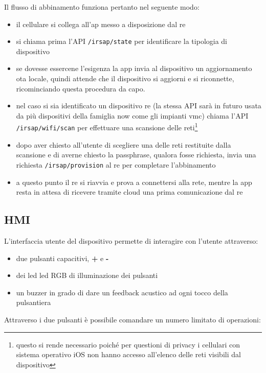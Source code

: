 \documentclass[12pt,a4paper,twoside,titlepage]{book}
\begin{document}
Il flusso di abbinamento funziona pertanto nel seguente modo:
\begin{itemize}
    \item il cellulare si collega all'\acrshort{ap} messo a disposizione dal \acrshort{re}
    \item si chiama prima l'API \texttt{/irsap/state} per identificare la tipologia di dispositivo
    \item se dovesse essercene l'esigenza la app invia al dispositivo un aggiornamento \acrshort{ota} locale, 
        quindi attende che il dispositivo si aggiorni e si riconnette, ricominciando questa procedura da capo.
    \item nel caso si sia identificato un dispositivo \acrshort{re} (la stessa API sarà in futuro 
        usata da più dispositivi della famiglia \Gls{now} come gli impianti \acrshort{vmc}) chiama 
        l'API \texttt{/irsap/wifi/scan} per effettuare una scansione delle reti\footnote{questo si rende
        necessario poiché per questioni di privacy i cellulari con sistema operativo iOS non hanno accesso all'elenco 
        delle reti visibili dal dispositivo}
    \item dopo aver chiesto all'utente di scegliere una delle reti restituite dalla scansione e di 
        averne chiesto la passphrase, qualora fosse richiesta, invia una richiesta \texttt{/irsap/provision}
        al \acrshort{re} per completare l'abbinamento 
    \item a questo punto il \acrshort{re} si riavvia e prova a connettersi alla rete, mentre la app resta 
        in attesa di ricevere tramite \gls{cloud} una prima comunicazione dal \acrshort{re}
\end{itemize}

\subsection{HMI}

L'interfaccia utente del dispositivo permette di interagire con l'utente attraverso:
\begin{itemize}
    \item due pulsanti capacitivi, \textbf{+} e \textbf{-}
    \item dei led \acrshort{led} RGB di illuminazione dei pulsanti 
    \item un buzzer in grado di dare un feedback acustico ad ogni tocco della pulsantiera
\end{itemize}

Attraverso i due pulsanti è possibile comandare un numero limitato di operazioni:
\end{document}
